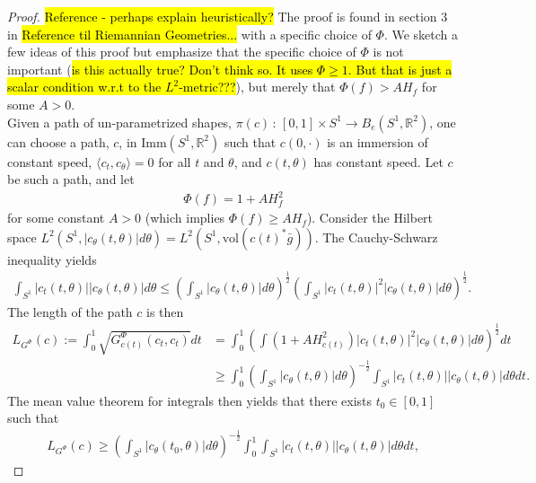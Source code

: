 \documentclass[a4,danish]{article}
\theoremstyle{break}
\theoremstyle{definition}
\theoremstyle{Break}
\newcommand{\R}{\mathbb{R}}
\begin{document}
\begin{proof}
\hl{Reference - perhaps explain heuristically?} The proof is found in section 3 in \hl{Reference til  Riemannian Geometries...} with a specific choice of $\Phi$. We sketch a few ideas of this proof but emphasize that the specific choice of $\Phi$ is not important (\hl{is this actually true? Don't think so. It uses $\Phi \geq 1$. But that is just a scalar condition w.r.t to the $L^2$-metric???}), but merely that $\Phi(f) > AH_f$ for some $A > 0$. \\[0.2 cm]
Given a path of un-parametrized shapes, $\pi(c) \, : \, [0,1] \times S^1 \rightarrow B_e(S^1, \R^2)$, one can choose a path, $c$, in Imm$(S^1, \R^2)$ such that $c(0, \cdot)$ is an immersion of constant speed, $\langle c_t, c_\theta \rangle = 0$ for all $t$ and $\theta$, and $c(t , \theta)$ has constant speed. Let $c$ be such a path, and let
\begin{align*}
\Phi(f) = 1 + A H_f ^2
\end{align*}  
for some constant $A > 0$ (which implies $\Phi(f) \geq AH_f$). Consider the Hilbert space $L^2(S^1, \left| c_\theta(t, \theta) \right| d\theta) = L^2(S^1, \text{vol} (c(t)^* \bar{g}))$. The Cauchy-Schwarz inequality yields
\begin{align*}
\int_{S^1} \left| c_t(t, \theta) \right| \left| c_\theta(t, \theta) \right| d \theta \leq \left(\int_{S^1} \left| c_\theta(t, \theta) \right| d \theta \right) ^{\frac{1}{2}} \left( \int_{S^1} \left| c_t(t, \theta) \right|^2 \left| c_\theta(t, \theta) \right| d \theta   \right) ^{\frac{1}{2}}.
\end{align*} 
The length of the path $c$ is then
\begin{align*}
L_{G^{\Phi}}(c) := \int_0^1  \sqrt{G^{\Phi}_{c(t)}(c_t, c_t)} dt &= \int_0^1 \left( \int (1 + AH_{c(t)}^2 ) \left| c_t(t, \theta) \right|^2 \left| c_\theta(t, \theta) \right| d\theta     \right) ^{\frac{1}{2}} dt \\
& \geq \int_0^1 \left(\int_{S^1} \left| c_\theta(t, \theta) \right| d \theta \right) ^{-\frac{1}{2}} \int_{S^1} \left| c_t(t, \theta) \right| \left| c_\theta(t, \theta) \right| d \theta dt.
\end{align*}
The mean value theorem for integrals then yields that there exists $t_0 \in [0, 1]$ such that
\begin{align*}
L_{G^{\Phi}}(c)\geq  \left(\int_{S^1} \left| c_\theta(t_0, \theta) \right| d \theta \right) ^{-\frac{1}{2}} \int_0^1 \int_{S^1} \left| c_t(t, \theta) \right| \left| c_\theta(t, \theta) \right| d \theta dt,

\end{align*}
\end{proof}
\end{document}
